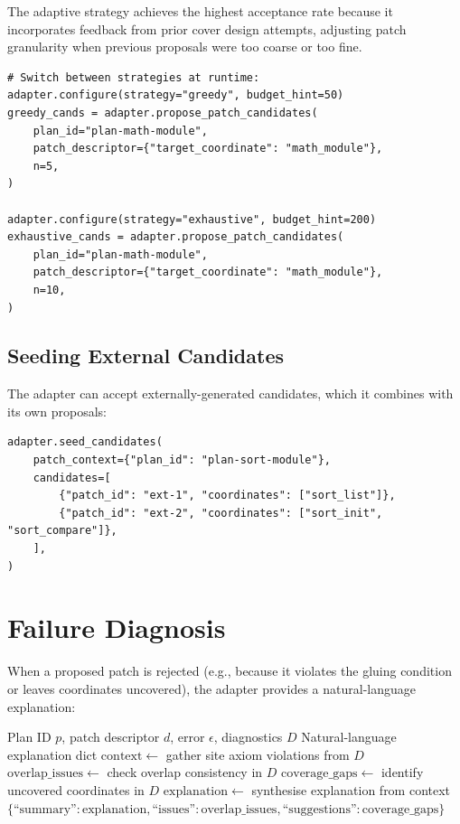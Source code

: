 \documentclass[11pt]{article}
\begin{document}
The adaptive strategy achieves the highest acceptance rate
because it incorporates feedback from prior
cover design attempts, adjusting patch granularity when previous proposals
were too coarse or too fine.

\begin{lstlisting}[style=jugeo-python]
# Switch between strategies at runtime:
adapter.configure(strategy="greedy", budget_hint=50)
greedy_cands = adapter.propose_patch_candidates(
    plan_id="plan-math-module",
    patch_descriptor={"target_coordinate": "math_module"},
    n=5,
)

adapter.configure(strategy="exhaustive", budget_hint=200)
exhaustive_cands = adapter.propose_patch_candidates(
    plan_id="plan-math-module",
    patch_descriptor={"target_coordinate": "math_module"},
    n=10,
)
\end{lstlisting}

\subsection{Seeding External Candidates}

The adapter can accept externally-generated candidates, which it combines
with its own proposals:

\begin{lstlisting}[style=jugeo-python]
adapter.seed_candidates(
    patch_context={"plan_id": "plan-sort-module"},
    candidates=[
        {"patch_id": "ext-1", "coordinates": ["sort_list"]},
        {"patch_id": "ext-2", "coordinates": ["sort_init", "sort_compare"]},
    ],
)
\end{lstlisting}

\section{Failure Diagnosis}\label{sec:diagnosis}

When a proposed patch is rejected (e.g., because it violates the gluing
condition or leaves coordinates uncovered), the adapter provides a
natural-language explanation:

\begin{algorithm}[h]
\caption{Copilot Patch Failure Diagnosis}
\label{alg:diagnosis}
\begin{algorithmic}[1]
\REQUIRE Plan ID $p$, patch descriptor $d$, error $\epsilon$, diagnostics $D$
\ENSURE Natural-language explanation dict
\STATE $\mathrm{context} \gets$ gather site axiom violations from $D$
\STATE $\mathrm{overlap\_issues} \gets$ check overlap consistency in $D$
\STATE $\mathrm{coverage\_gaps} \gets$ identify uncovered coordinates in $D$
\STATE $\mathrm{explanation} \gets$ synthesise explanation from context
\RETURN $\{\text{``summary''}: \mathrm{explanation},
          \text{``issues''}: \mathrm{overlap\_issues},
          \text{``suggestions''}: \mathrm{coverage\_gaps}\}$
\end{algorithmic}
\end{algorithm}
\end{document}
